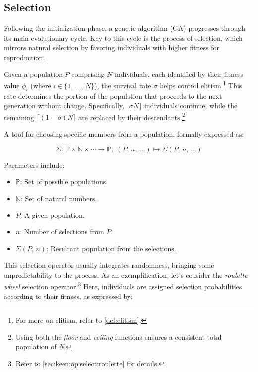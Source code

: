 \subsection{Selection}
\label{sec:bg:ga:select}
  Following the initialization phase, a genetic algorithm (GA) progresses 
  through its main evolutionary cycle.
  Key to this cycle is the process of selection, which mirrors natural selection 
  by favoring individuals with higher fitness for reproduction.

  Given a population \(P\) comprising \(N\) individuals, each identified by 
  their fitness value \(\phi_i\) (where \(i \in \{1,\, \dots,\, N\}\)), the 
  survival rate \(\sigma\) helps control elitism.\footnote{
    For more on elitism, refer to \vref{def:elitism}.
  } This rate determines the portion of the population that proceeds to the next generation without change.
  Specifically, \(\lfloor\sigma N\rfloor\) individuals continue, while the 
  remaining \(\lceil(1 - \sigma)N\rceil\) are replaced by their
  descendants.\footnote{
    Using both the \textit{floor} and \textit{ceiling} functions ensures a 
    consistent total population of \(N\).
  }

  \begin{definition}
  \label{def:selection_operator}
    A tool for choosing specific members from a population, formally expressed 
    as:

    \[
      \Sigma :\: \mathbb{P} \times \mathbb{N} \times \cdots \to \mathbb{P};\;
      (P,\, n,\, \dots) \mapsto \Sigma(P,\, n,\, \dots)
    \]

    Parameters include:
    
    \begin{itemize}
      \item \(\mathbb{P}\): Set of possible populations.
      \item \(\mathbb{N}\): Set of natural numbers.
      \item \(P\): A given population.
      \item \(n\): Number of selections from \(P\).
      \item \(\Sigma(P,\, n)\): Resultant population from the selections.
    \end{itemize}
  \end{definition}

  This selection operator usually integrates randomness, bringing some 
  unpredictability to the process.
  As an exemplification, let's consider the \textit{roulette wheel} selection 
  operator.\footnote{
    Refer to \vref{sec:keen:op:select:roulette} for details.
  } Here, individuals are assigned selection probabilities according to their 
  fitness, as expressed by:

